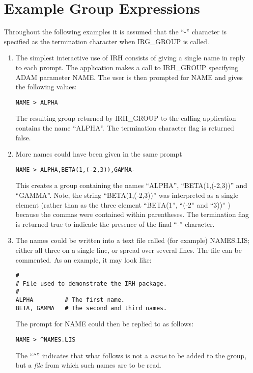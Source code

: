 \section {Example Group Expressions}
\label {SEC:EXAM}
Throughout the following examples it is assumed that the ``-'' character is 
specified as the termination character when IRG\_GROUP is called.

\begin{enumerate}

\item
The simplest interactive use of IRH consists of giving a single name in reply to
each prompt. The application makes a call to IRH\_GROUP specifying ADAM
parameter NAME. The user is then prompted for NAME and gives the
following values:
\begin{verbatim}
NAME > ALPHA
\end{verbatim}
The resulting group returned by IRH\_GROUP to the calling application contains
the name ``ALPHA''. The termination character flag is returned false.

\item More names could have been given in the same prompt
\begin{verbatim}
NAME > ALPHA,BETA(1,(-2,3)),GAMMA-
\end{verbatim}
This creates a group containing the names ``ALPHA'', ``BETA(1,(-2,3))'' and
``GAMMA''. Note, the string ``BETA(1,(-2,3))'' was interpreted as a single
element (rather than as the three element ``BETA(1'', ``(-2'' and ``3))'' )
because the commas were contained within parentheses. The termination flag is
returned true to indicate the presence of the final ``-'' character. 

\item The names could be written into a text file called (for example) 
NAMES.LIS; either all three on a single line, or spread over several lines. The 
file can be commented. As an example, it may look like:
\begin{verbatim}
#  
# File used to demonstrate the IRH package.
#
ALPHA         # The first name.
BETA, GAMMA   # The second and third names.
\end{verbatim}
The prompt for NAME could then be replied to as follows:
\begin{verbatim}
NAME > ^NAMES.LIS
\end{verbatim}
The ``\verb+^+'' indicates that what follows is not a {\em name} to be added to the 
group, but a {\em file} from which such names are to be read. 


\end{enumerate}
